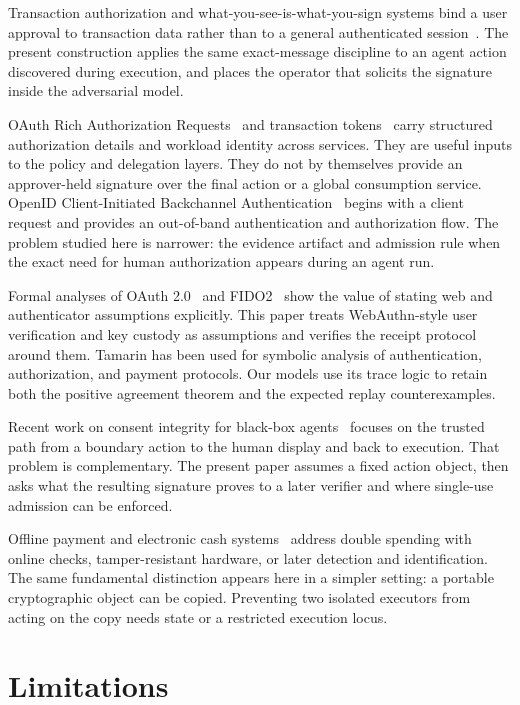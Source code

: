 \documentclass[10.5pt]{article}
\begin{document}
Transaction authorization and what-you-see-is-what-you-sign systems bind a user
approval to transaction data rather than to a general authenticated
session~\cite{wysiwys}.
The present construction applies the same exact-message discipline to an agent
action discovered during execution, and places the operator that solicits the
signature inside the adversarial model.

OAuth Rich Authorization Requests~\cite{rar} and transaction
tokens~\cite{transactiontokens} carry structured authorization details and
workload identity across services. They are useful
inputs to the policy and delegation layers. They do not by themselves provide an
approver-held signature over the final action or a global consumption service.
OpenID Client-Initiated Backchannel Authentication~\cite{ciba} begins with a client request
and provides an out-of-band authentication and authorization flow. The problem
studied here is narrower: the evidence artifact and admission rule when the exact
need for human authorization appears during an agent run.

Formal analyses of OAuth 2.0~\cite{oauthformal} and FIDO2~\cite{fido2formal}
show the value of stating web and authenticator assumptions explicitly. This
paper treats WebAuthn-style user verification and key custody as assumptions and
verifies the receipt protocol around them. Tamarin has been used for symbolic
analysis of authentication, authorization, and payment protocols. Our models use
its trace logic to retain both the positive agreement theorem and the expected
replay counterexamples.

Recent work on consent integrity for black-box agents~\cite{consentintegrity}
focuses on the trusted path from a boundary action to the human display and back
to execution. That problem is complementary. The present paper assumes a fixed
action object, then asks what the resulting signature proves to a later verifier
and where single-use admission can be enforced.

Offline payment and electronic cash systems~\cite{chaum,offlinecash} address double spending with online
checks, tamper-resistant hardware, or later detection and identification. The
same fundamental distinction appears here in a simpler setting: a portable
cryptographic object can be copied. Preventing two isolated executors from acting
on the copy needs state or a restricted execution locus.

\section{Limitations}
\end{document}
